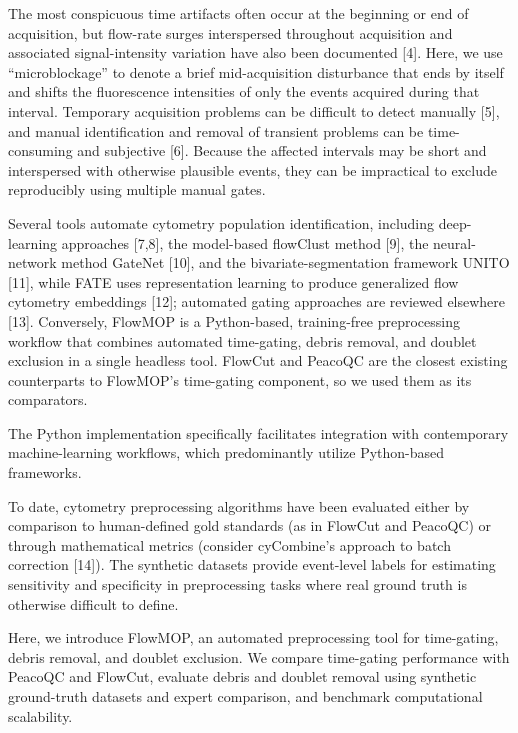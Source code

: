 \documentclass[ASNA]{latex/wiley/USG}
\begin{document}
The most conspicuous time artifacts often occur at the beginning or end
of acquisition, but flow-rate surges interspersed throughout acquisition
and associated signal-intensity variation have also been documented
{[}4{]}. Here, we use ``microblockage'' to denote a brief
mid-acquisition disturbance that ends by itself and shifts the
fluorescence intensities of only the events acquired during that
interval. Temporary acquisition problems can be difficult to detect
manually {[}5{]}, and manual identification and removal of transient
problems can be time-consuming and subjective {[}6{]}. Because the
affected intervals may be short and interspersed with otherwise
plausible events, they can be impractical to exclude reproducibly using
multiple manual gates.

Several tools automate cytometry population identification, including
deep-learning approaches {[}7,8{]}, the model-based flowClust method
{[}9{]}, the neural-network method GateNet {[}10{]}, and the
bivariate-segmentation framework UNITO {[}11{]}, while FATE uses
representation learning to produce generalized flow cytometry embeddings
{[}12{]}; automated gating approaches are reviewed elsewhere {[}13{]}.
Conversely, FlowMOP is a Python-based, training-free preprocessing
workflow that combines automated time-gating, debris removal, and
doublet exclusion in a single headless tool. FlowCut and PeacoQC are the
closest existing counterparts to FlowMOP's time-gating component, so we
used them as its comparators.

The Python implementation specifically facilitates integration with
contemporary machine-learning workflows, which predominantly utilize
Python-based frameworks.

To date, cytometry preprocessing algorithms have been evaluated either
by comparison to human-defined gold standards (as in FlowCut and
PeacoQC) or through mathematical metrics (consider cyCombine's approach
to batch correction {[}14{]}). The synthetic datasets provide
event-level labels for estimating sensitivity and specificity in
preprocessing tasks where real ground truth is otherwise difficult to
define.

Here, we introduce FlowMOP, an automated preprocessing tool for
time-gating, debris removal, and doublet exclusion. We compare
time-gating performance with PeacoQC and FlowCut, evaluate debris and
doublet removal using synthetic ground-truth datasets and expert
comparison, and benchmark computational scalability.

\FloatBarrier
\end{document}
